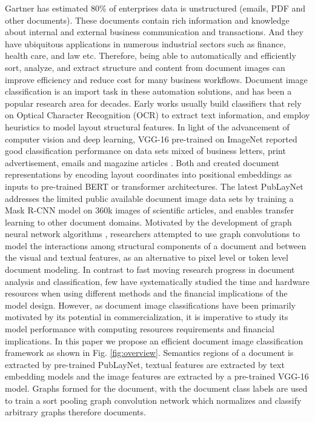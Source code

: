 \documentclass[letterpaper]{article}
\begin{document}
Gartner has estimated 80\% of enterprises data is unstructured (emails, PDF and other documents). These documents contain rich information and knowledge about internal and external business communication and transactions. And they have ubiquitous applications in numerous industrial sectors such as finance, health care, and law etc. Therefore, being able to automatically and efficiently sort, analyze, and extract structure and content from document images can improve  efficiency and reduce cost for many business workflows. Document image classification is an import task in these automation solutions, and has been a popular research area for decades. Early works usually build classifiers that rely on Optical Character Recognition (OCR) to extract text information, and employ heuristics to model layout structural features. In light of the advancement of computer vision and deep learning, VGG-16 \cite{VGG16} pre-trained on ImageNet \cite{imagenet_cvpr09} reported good classification performance on data sets mixed of business letters, print advertisement, emails and magazine articles \cite{kumar2014structural}. Both \cite{bertgrid} and \cite{layoutLM} created document representations by encoding layout coordinates into positional embeddings as inputs to pre-trained BERT \cite{BERT} or transformer architectures. The latest PubLayNet \cite{publaynet} addresses the limited public available document image data sets by training a Mask R-CNN \cite{maskrcnn} model on 360k images of scientific articles, and enables transfer learning to other document domains. Motivated by the development of graph neural network algorithms \cite{gnn_survey,dgcnn,gnn_diffpool}, researchers \cite{gnn_multimodal} attempted to use graph convolutions to model the interactions among structural components of a document and between the visual and textual features, as an alternative to pixel level or token level document modeling. 
In contrast to fast moving research progress in document analysis and classification, few have systematically studied the time and hardware resources when using different methods and the financial implications of the model design. However, as document image classifications have been primarily motivated by its potential in commercialization, it is imperative to study its model performance with computing resources requirements and financial implications. In this paper we propose an efficient document image classification framework as shown in Fig. \ref{fig:overview}. Semantics regions of a document is extracted by pre-trained PubLayNet, textual features are extracted by text embedding models and the image features are extracted by a pre-trained VGG-16 model. Graphs formed for the document, with the document class labels are used to train a sort pooling graph convolution network \cite{dgcnn} which normalizes and classify arbitrary graphs therefore documents. 
\end{document}
